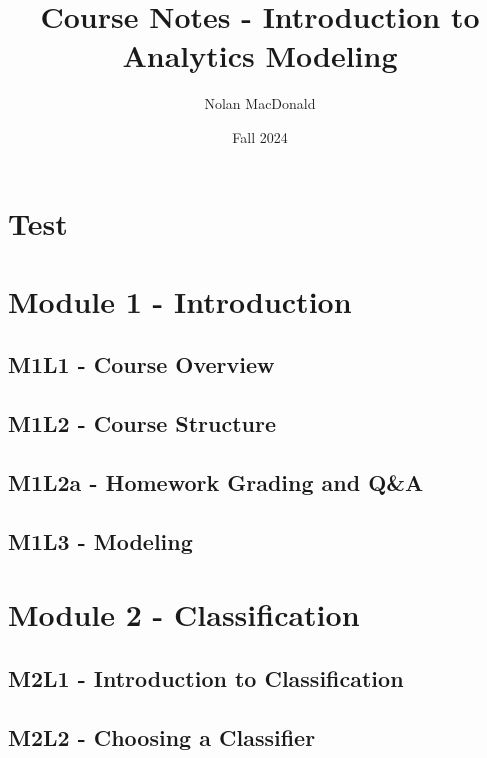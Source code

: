 \documentclass[
]{book}
\title{Course Notes - Introduction to Analytics Modeling}
\author{Nolan MacDonald}
\date{Fall 2024}
\begin{document}
\maketitle

{
\setcounter{tocdepth}{1}
\tableofcontents
}
\chapter{Test}\label{test}

\chapter{Module 1 - Introduction}\label{module-1---introduction}

\section{M1L1 - Course Overview}\label{m1l1---course-overview}

\section{M1L2 - Course Structure}\label{m1l2---course-structure}

\section{M1L2a - Homework Grading and Q\&A}\label{m1l2a---homework-grading-and-qa}

\section{M1L3 - Modeling}\label{m1l3---modeling}

\chapter{Module 2 - Classification}\label{module-2---classification}

\section{M2L1 - Introduction to Classification}\label{m2l1---introduction-to-classification}

\section{M2L2 - Choosing a Classifier}\label{m2l2---choosing-a-classifier}
\end{document}
